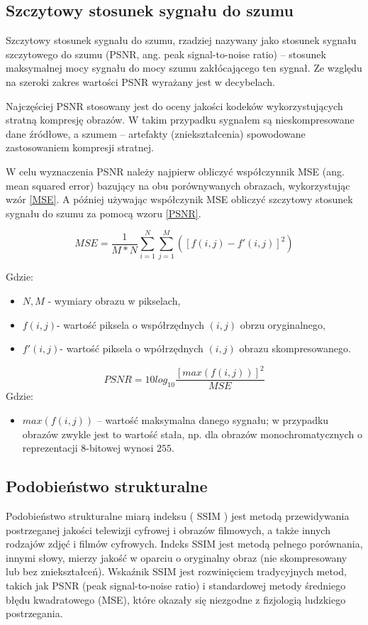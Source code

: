 \documentclass[a4paper,12pt,twoside,openany]{report}
\begin{document}
\subsection{Szczytowy stosunek sygnału do szumu}
Szczytowy stosunek sygnału do szumu, rzadziej nazywany jako stosunek sygnału szczytowego do szumu (PSNR, ang. peak signal-to-noise ratio) – stosunek maksymalnej mocy sygnału do mocy szumu zakłócającego ten sygnał. Ze względu na szeroki zakres wartości PSNR wyrażany jest w decybelach. 

Najczęściej PSNR stosowany jest do oceny jakości kodeków wykorzystujących stratną kompresję obrazów. W takim przypadku sygnałem są nieskompresowane dane źródłowe, a szumem – artefakty (zniekształcenia) spowodowane zastosowaniem kompresji stratnej.

W celu wyznaczenia PSNR należy najpierw obliczyć współczynnik MSE (ang. mean squared error) bazujący na obu porównywanych obrazach, wykorzystując wzór \ref{MSE}. A później używając współczynik MSE obliczyć szczytowy stosunek sygnału do szumu za pomocą wzoru \ref{PSNR}. 

\begin{equation}
	MSE= \frac{1}{M*N} \sum_{i=1}^{N} \sum_{j=1}^{M} ([f(i,j)-f'(i,j)]^2) \label{MSE}
\end{equation}

Gdzie:
\begin{itemize}
	\item $N,M$ - wymiary obrazu w pikselach,
	\item $f(i,j)$- wartość piksela o współrzędnych $(i,j)$ obrzu oryginalnego,
	\item $f'(i,j)$- wartość piksela o wpółrzędnych $(i,j)$ obrazu skompresowanego.
\end{itemize}

\begin{equation}
	PSNR= 10 log_{10}{\frac{[max(f(i,j))]^2}{MSE}}
	\label{PSNR}
\end{equation}
Gdzie: 
\begin{itemize}
	\item $max(f(i,j))$ – wartość maksymalna danego sygnału; w przypadku obrazów zwykle jest to wartość stała, np. dla obrazów monochromatycznych o reprezentacji 8-bitowej wynosi $255$.
\end{itemize}

\subsection{Podobieństwo strukturalne}
Podobieństwo strukturalne miarą indeksu ( SSIM ) jest metodą przewidywania postrzeganej jakości telewizji cyfrowej i obrazów filmowych, a także innych rodzajów zdjęć i filmów cyfrowych. Indeks SSIM jest metodą pełnego porównania, innymi słowy, mierzy jakość w oparciu o oryginalny obraz (nie skompresowany lub bez zniekształceń). Wskaźnik SSIM jest rozwinięciem tradycyjnych metod, takich jak PSNR (peak signal-to-noise ratio) i standardowej metody średniego błędu kwadratowego (MSE), które okazały się niezgodne z fizjologią ludzkiego postrzegania. 
\end{document}

